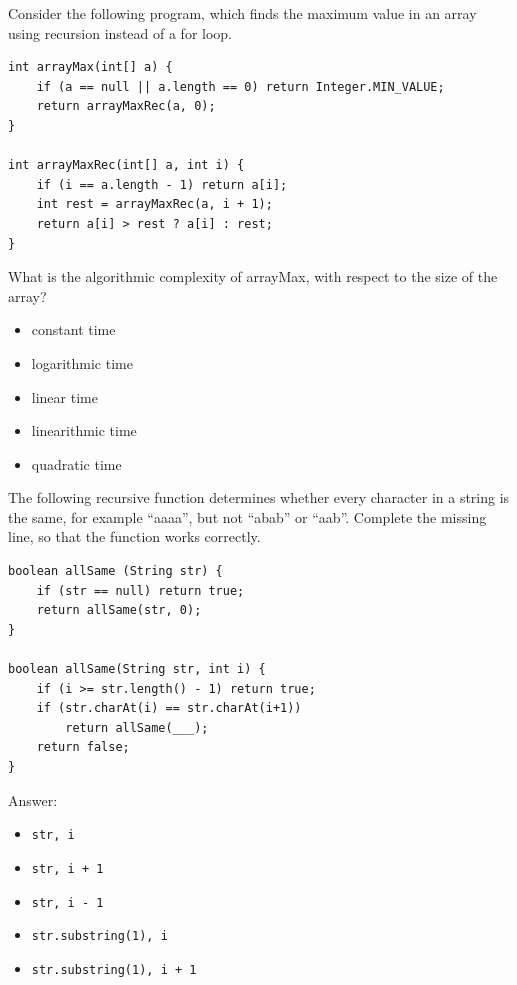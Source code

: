 \begin{question}
Consider the following program, which finds the maximum value in an array using recursion instead of a for loop.

\begin{lstlisting}
int arrayMax(int[] a) {
    if (a == null || a.length == 0) return Integer.MIN_VALUE;
    return arrayMaxRec(a, 0);
}

int arrayMaxRec(int[] a, int i) {
    if (i == a.length - 1) return a[i];
    int rest = arrayMaxRec(a, i + 1);
    return a[i] > rest ? a[i] : rest;
}
\end{lstlisting}

What is the algorithmic complexity of arrayMax, with respect to the size of the array?
\begin{itemize}[leftmargin=2em,itemsep=1pt,topsep=2pt]
\item[\cb{0}] constant time
\item[\cb{0}] logarithmic time
\item[\cb{1}] linear time
\item[\cb{0}] linearithmic time
\item[\cb{0}] quadratic time
\end{itemize}
\end{question}

\begin{question}
The following recursive function determines whether every character in a string is the same, for example ``aaaa'', but not ``abab'' or ``aab''.
Complete the missing line, so that the function works correctly.

\begin{lstlisting}
boolean allSame (String str) {
    if (str == null) return true;
    return allSame(str, 0);
}

boolean allSame(String str, int i) {
    if (i >= str.length() - 1) return true;
    if (str.charAt(i) == str.charAt(i+1))
        return allSame(___);
    return false;
}
\end{lstlisting}

Answer:
\begin{itemize}[leftmargin=2em,itemsep=1pt,topsep=2pt]
\item[\cb{0}] \lstinline|str, i|
\item[\cb{1}] \lstinline|str, i + 1|
\item[\cb{0}] \lstinline|str, i - 1|
\item[\cb{0}] \lstinline|str.substring(1), i|
\item[\cb{0}] \lstinline|str.substring(1), i + 1|
\end{itemize}
\end{question}
